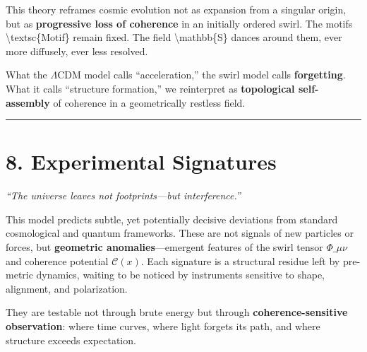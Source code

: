 \documentclass[
  11pt,
]{article}
\begin{document}
This theory reframes cosmic evolution not as expansion from a singular
origin, but as \textbf{progressive loss of coherence} in an initially
ordered swirl. The motifs \textbackslash textsc\{Motif\} remain fixed.
The field \textbackslash mathbb\{S\} dances around them, ever more
diffusely, ever less resolved.

What the \(\Lambda\)CDM model calls ``acceleration,'' the swirl model
calls \textbf{forgetting}. What it calls ``structure formation,'' we
reinterpret as \textbf{topological self-assembly} of coherence in a
geometrically restless field.

\begin{center}\rule{0.5\linewidth}{0.5pt}\end{center}

\section{8. Experimental Signatures}\label{experimental-signatures}

\emph{``The universe leaves not footprints---but interference.''}

This model predicts subtle, yet potentially decisive deviations from
standard cosmological and quantum frameworks. These are not signals of
new particles or forces, but \textbf{geometric anomalies}---emergent
features of the swirl tensor \(\Phi\_{\mu\nu}\) and coherence potential
\(\mathcal{C}(x)\). Each signature is a structural residue left by
pre-metric dynamics, waiting to be noticed by instruments sensitive to
shape, alignment, and polarization.

They are testable not through brute energy but through
\textbf{coherence-sensitive observation}: where time curves, where light
forgets its path, and where structure exceeds expectation.
\end{document}
